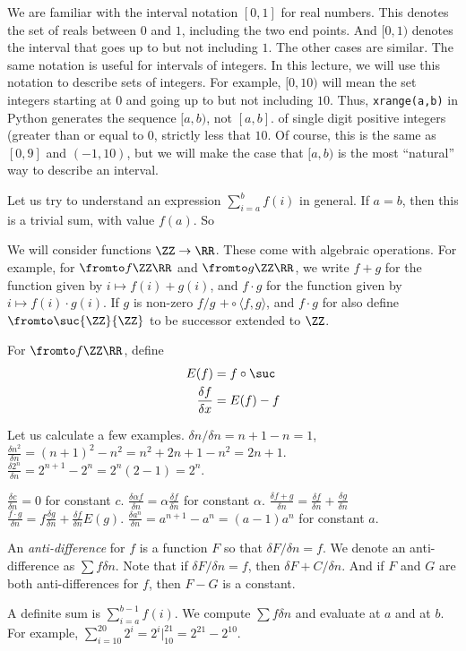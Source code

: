 We are familiar with the interval notation $[0,1]$ for real numbers. This denotes the set of reals between $0$ and $1$, including the two end points. And $[0,1)$ denotes the interval that goes up to but not including $1$. The other cases are similar.
The same notation is useful for intervals of integers. In this lecture, we will use this notation to describe sets of integers. For example, $[0,10)$ will mean the set integers starting at $0$ and going up to but not including $10$. Thus, \lstinline!xrange(a,b)! in Python generates the sequence $[a,b)$, not $[a,b]$. 
of single digit positive integers (greater than or equal to $0$, strictly less that $10$. Of course, this is the same as $[0,9]$ and $(-1,10)$, but we will make the case that $[a,b)$ is the most ``natural'' way to describe an interval. 

Let us try to understand an expression $\sum_{i=a}^b f(i)$ in general. If $a=b$, then this is a trivial sum, with value $f(a)$. So   

We will consider functions $\ZZ\to \RR$. These come with algebraic operations. For example, for $\fromto f\ZZ\RR$ and $\fromto g\ZZ\RR$,
we write $f+g$ for the function given by $i\mapsto f(i)+g(i)$, and $f\cdot g$ for
the function given by $i\mapsto f(i)\cdot g(i)$. If $g$ is non-zero $f/g$ $+\circ\langle f,g\rangle$, and $f\cdot g$ for also define $\fromto \suc{\ZZ}{\ZZ}$ to be successor extended to $\ZZ$.

\begin{defn}
	For $\fromto f\ZZ\RR$, define
	\begin{align*}
		E(f) &= f\circ \suc\\
		\frac{\delta f}{\delta x} &= E(f)-f
	\end{align*}
\end{defn}

Let us calculate a few examples. $\delta n/\delta n = n+1-n = 1$,
$\frac{\delta n^2}{\delta n} = (n+1)^2-n^2 = n^2+2n+1 -n^2 = 2n+1$.
$\frac{\delta 2^n}{\delta n} = 2^{n+1}-2^n = 2^n(2-1)=2^n$.

$\frac{\delta c}{\delta n} = 0$ for constant $c$.
$\frac{\delta \alpha f}{\delta n} = \alpha\frac{\delta f}{\delta n}$ for constant $\alpha$.
$\frac{\delta f+g}{\delta n}=\frac{\delta f}{\delta n}+\frac{\delta g}{\delta n}$
$\frac{f\cdot g}{\delta n} = f\frac{\delta g}{\delta n}+\frac{\delta f}{\delta n}E(g)$.
$\frac{\delta a^n}{\delta n} = a^{n+1}-a^n = (a-1)a^n$ for constant $a$.

An \emph{anti-difference} for $f$ is a function $F$ so that $\delta F/\delta n = f$. We denote an anti-difference as $\sum f\delta n$.
Note that if $\delta F/\delta n=f$, then $\delta F+C/\delta n$.
And if $F$ and $G$ are both anti-differences for $f$, then $F-G$ is
a constant.

A definite sum is $\sum_{i=a}^{b-1}f(i)$. We compute $\sum f\delta n$
and evaluate at $a$ and at $b$. For example, $\sum_{i=10}^{20}2^i = 2^i|_10^{21} = 2^{21}-2^{10}$.

